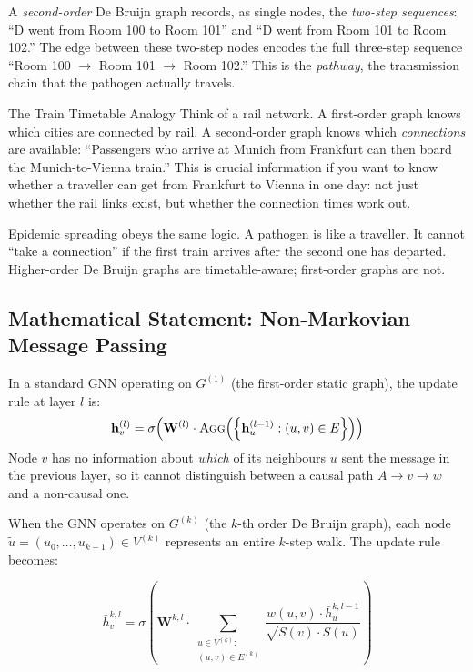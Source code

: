 A \emph{second-order} De Bruijn graph records, as single nodes, the \emph{two-step sequences}:
``D went from Room 100 to Room 101'' and ``D went from Room 101 to Room 102.'' The edge between
these two-step nodes encodes the full three-step sequence ``Room 100 $\to$ Room 101 $\to$ Room
102.'' This is the \emph{pathway}, the transmission chain that the pathogen actually travels.

\begin{analogybox}{The Train Timetable Analogy}
Think of a rail network. A first-order graph knows which cities are connected by rail. A
second-order graph knows which \emph{connections} are available: ``Passengers who arrive at
Munich from Frankfurt can then board the Munich-to-Vienna train.'' This is crucial information
if you want to know whether a traveller can get from Frankfurt to Vienna in one day: not just
whether the rail links exist, but whether the connection times work out.

Epidemic spreading obeys the same logic. A pathogen is like a traveller. It cannot ``take a
connection'' if the first train arrives after the second one has departed. Higher-order De Bruijn
graphs are timetable-aware; first-order graphs are not.
\end{analogybox}

\subsection{Mathematical Statement: Non-Markovian Message Passing}

In a standard GNN operating on $G^{(1)}$ (the first-order static graph), the update rule at
layer $l$ is:
\[
    \mathbf{h}_v^{(l)} = \sigma\!\left(\mathbf{W}^{(l)} \cdot \textsc{Agg}\!\left(
        \left\{\mathbf{h}_u^{(l-1)} : (u, v) \in E \right\}\right)\right)
\]
Node $v$ has no information about \emph{which} of its neighbours $u$ sent the message in the
previous layer, so it cannot distinguish between a causal path $A \to v \to w$ and a
non-causal one.

When the GNN operates on $G^{(k)}$ (the $k$-th order De Bruijn graph), each node
$\tilde{u} = (u_0, \ldots, u_{k-1}) \in V^{(k)}$ represents an entire $k$-step walk. The
update rule becomes:

\begin{equation}
    \bar{h}_{v}^{k,l} = \sigma\!\left(\mathbf{W}^{k,l} \cdot
    \sum_{\substack{u \in V^{(k)}: \\ (u,v) \in E^{(k)}}}
    \frac{w(u,v) \cdot \bar{h}_u^{k,l-1}}{\sqrt{S(v) \cdot S(u)}}\right)
    \label{eq:dbgnn_update}
\end{equation}

